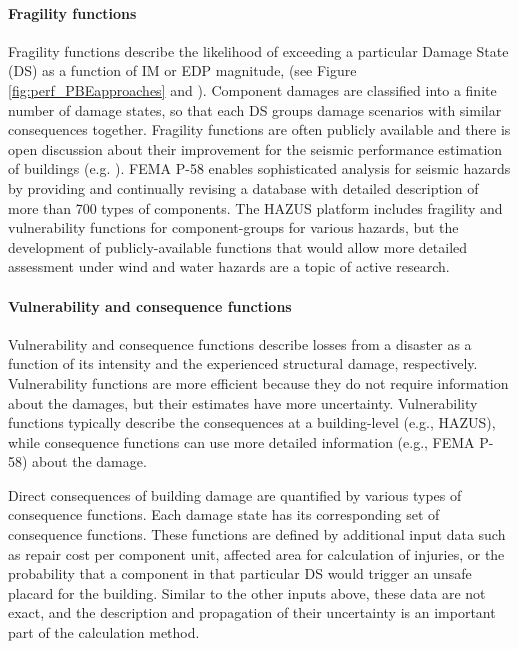 \paragraph{Fragility functions} Fragility functions describe the likelihood of exceeding a particular Damage State (DS) as a function of IM or EDP magnitude, (see Figure \ref{fig:perf_PBEapproaches} and \citep{baker2021seismic}). Component damages are classified into a finite number of damage states, so that each DS groups damage scenarios with similar consequences together. Fragility functions are often publicly available and there is open discussion about their improvement for the seismic performance estimation of buildings (e.g. \cite{silva2019current}). FEMA P-58 enables sophisticated analysis for seismic hazards by providing \citep{atc2012p-58} and continually revising \citep{atc2018p-58-1} a database with detailed description of more than 700 types of components. The HAZUS platform includes fragility and vulnerability functions for component-groups for various hazards, but the development of publicly-available functions that would allow more detailed assessment under wind and water hazards are a topic of active research.

\paragraph{Vulnerability and consequence functions} Vulnerability and consequence functions describe losses from a disaster as a function of its intensity and the experienced structural damage, respectively. Vulnerability functions are more efficient because they do not require information about the damages, but their estimates have more uncertainty. Vulnerability functions typically describe the consequences at a building-level (e.g., HAZUS), while consequence functions can use more detailed information (e.g., FEMA P-58) about the damage.

Direct consequences of building damage are quantified by various types of consequence functions. Each damage state has its corresponding set of consequence functions. These functions are defined by additional input data such as repair cost per component unit, affected area for calculation of injuries, or the probability that a component in that particular DS would trigger an unsafe placard for the building. Similar to the other inputs above, these data are not exact, and the description and propagation of their uncertainty is an important part of the calculation method.

